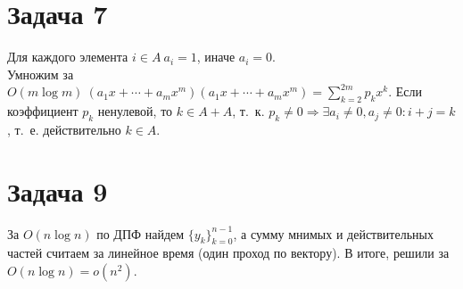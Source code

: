 \documentclass[a4paper,12pt]{article} %
\begin{document}
\section*{Задача 7}
Для каждого элемента $i \in A ~a_i=1$, иначе $a_i = 0$. \\
Умножим за $O(m\log{m})~(a_1x+\cdots+a_mx^m)(a_1x+\cdots+a_mx^m) = \sum_{k=2}^{2m}{p_kx^k}$. Если коэффициент $p_k$ ненулевой, то $k \in A+A$, т.~к. $p_k \neq 0 \Rightarrow \exists a_i\neq 0, a_j\neq 0: i+j=k$, т.~е. действительно $k \in A$.\\

\section*{Задача 9}
За $O(n\log{n})$ по ДПФ найдем $\{y_k\}_{k=0}^{n-1}$, а сумму мнимых и действительных частей считаем за линейное время (один проход по вектору). В итоге, решили за $O(n\log{n})=o(n^2)$.
\end{document}
